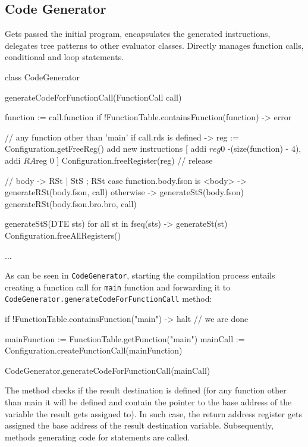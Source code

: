 \subsection{Code Generator}
Gets passed the initial program, encapsulates the generated instructions, delegates tree patterns to other
evaluator classes. Directly manages function calls, conditional and loop statements.

\begin{codeblock}
class CodeGenerator {
    generateCodeForFunctionCall(FunctionCall call) {
        function := call.function
        if !FunctionTable.containsFunction(function) -> { error }

        // any function other than 'main'
        if call.rds is defined -> {
            reg := Configuration.getFreeReg()
            add new instructions [
                addi $reg $0 -(size(function) - 4),
                addi $RA $reg 0
            ]
            Configuration.freeRegister(reg) // release
        }

        // body -> RSt | StS ; RSt
        case function.body.fson is <body> -> generateRSt(body.fson, call)
        otherwise -> {
            generateStS(body.fson)
            generateRSt(body.fson.bro.bro, call)
        }
    }

    generateStS(DTE sts) {
        for all st in fseq(sts) -> {
            generateSt(st)
            Configuration.freeAllRegisters()
        }
    }

    ...
}
\end{codeblock}
\newpage
As can be seen in \verb+CodeGenerator+, starting the compilation process entails creating a function call for
\verb+main+ function and forwarding it to \verb+CodeGenerator.generateCodeForFunctionCall+ method:
\begin{codeblock}
if !FunctionTable.containsFunction("main") -> { halt } // we are done

mainFunction := FunctionTable.getFunction("main")
mainCall := Configuration.createFunctionCall(mainFunction)

CodeGenerator.generateCodeForFunctionCall(mainCall)
\end{codeblock}
The method checks if the result destination is defined (for any function other than main it will be defined
and contain the pointer to the base address of the variable the result gets assigned to). In such case, the return address
register gets assigned the base address of the result destination variable. Subsequently, methods generating code for
statements are called.

